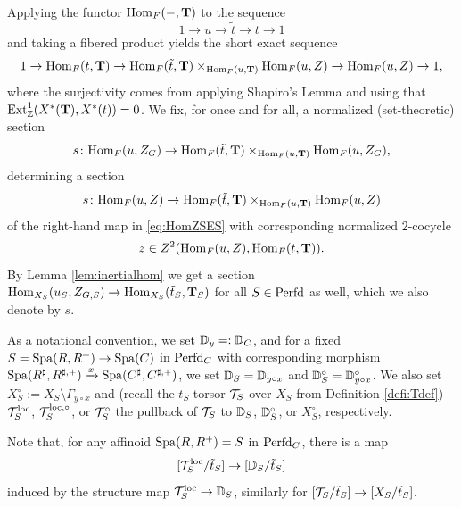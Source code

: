     Applying the functor $\mathrm{Hom}_{F}(-,\mathbf{T})$ to the sequence 
    \begin{equation*}
1 \to u \to \tilde{t} \to t \to 1
    \end{equation*}
    and taking a fibered product yields the short exact sequence
    \begin{equation}\label{eq:HomZSES}
        1 \to \mathrm{Hom}_{F}(t, \mathbf{T}) \to \mathrm{Hom}_{F}(\tilde{t}, \mathbf{T}) \times_{\mathrm{Hom}_{F}(u,\mathbf{T})} \mathrm{Hom}_{F}(u,Z) \to \mathrm{Hom}_{F}(u,Z) \to 1,
    \end{equation}
    where the surjectivity comes from applying Shapiro's Lemma and using that $\textnormal{Ext}^{1}_{\mathbb{Z}}(X^{*}(\mathbf{T}), X^{*}(t)) = 0$.
    We fix, for once and for all, a normalized (set-theoretic) section 
\begin{equation*}
    s \colon \mathrm{Hom}_{F}(u,Z_{G}) \to \mathrm{Hom}_{F}(\tilde{t}, \mathbf{T}) \times_{\mathrm{Hom}_{F}(u,\mathbf{T})} \mathrm{Hom}_{F}(u,Z_{G}),
\end{equation*}
determining a section 
\begin{equation*}
s \colon \mathrm{Hom}_{F}(u,Z) \to \mathrm{Hom}_{F}(\tilde{t}, \mathbf{T}) \times_{\mathrm{Hom}_{F}(u,\mathbf{T})} \mathrm{Hom}_{F}(u,Z)
\end{equation*}
of the right-hand map in \eqref{eq:HomZSES} with corresponding normalized $2$-cocycle 
\begin{equation*}
z \in Z^{2}(\mathrm{Hom}_{F}(u,Z),\mathrm{Hom}_{F}(t, \mathbf{T})).
\end{equation*}
By Lemma \ref{lem:inertialhom} we get a section $\mathrm{Hom}_{X_{S}}(u_{S},Z_{G,S}) \to \mathrm{Hom}_{X_{S}}(\tilde{t}_{S},\mathbf{T}_{S})$ for all $S \in \mathrm{Perfd}$ as well, which we also denote by $s$.
    

As a notational convention, we set $\mathbb D_{y} =: \mathbb D_{C}$, and for a fixed $S = \mathrm{Spa}(R,R^{+}) \to \mathrm{Spa}(C)$ in $\mathrm{Perfd}_{C}$ with corresponding morphism $\mathrm{Spa}(R^{\sharp},R^{\sharp,+}) \xrightarrow{x} \mathrm{Spa}(C^{\sharp},C^{\sharp,+})$, we set $\mathbb D_{S} = \mathbb D_{y \circ x}$ and $\mathbb D_{S}^{\circ} = \mathbb D_{y \circ x}^{\circ}$. We also set $X_{S}^{\circ}:= X_{S} \setminus \Gamma_{y \circ x}$ and (recall the $t_{S}$-torsor $\mathcal{T}_{S}$ over $X_{S}$ from Definition \ref{defi:Tdef}) $\mathcal{T}_{S}^{\textnormal{loc}}$, $\mathcal{T}_{S}^{\textnormal{loc},\circ}$, or $\mathcal{T}_{S}^{\circ}$  the pullback of $\mathcal{T}_{S}$ to $\mathbb D_{S}$, $\mathbb D_{S} ^{\circ}$, or $X_{S}^{\circ}$, respectively.

Note that, for any affinoid $\mathrm{Spa}(R,R^{+}) = S$ in $\mathrm{Perfd}_{C}$, there is a map 
\begin{equation}\label{eq:gerbesm}
[\mathcal{T}^{\textnormal{loc}}_{S}/\tilde{t}_{S}] \to [\mathbb D_{S}/\tilde{t}_{S}]
\end{equation}
induced by the structure map $\mathcal{T}_{S}^{\textnormal{loc}} \to \mathbb D_{S}$, similarly for $[\mathcal{T}_{S}/\tilde{t}_{S}] \to [X_{S}/\tilde{t}_{S}]$.

